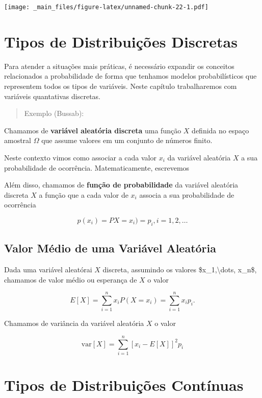 \documentclass[
]{book}
\begin{document}
\texttt{[image: \_main\_files/figure-latex/unnamed-chunk-22-1.pdf]}

\hypertarget{tipos-de-distribuiuxe7uxf5es-discretas}{%
\chapter{Tipos de Distribuições Discretas}\label{tipos-de-distribuiuxe7uxf5es-discretas}}

Para atender a situações mais práticas, é necessário expandir os conceitos relacionados a probabilidade de forma que tenhamos modelos probabilísticos que representem todos os tipos de variáveis. Neste capítulo trabalharemos com variáveis quantativas discretas.

\begin{quote}
Exemplo (Bussab):
\end{quote}

Chamamos de \textbf{variável aleatória discreta} uma função \(X\) definida no espaço amostral \(\Omega\) que assume valores em um conjunto de números finito.

Neste contexto vimos como associar a cada valor \(x_i\) da variável aleatória \(X\) a sua probabilidade de ocorrência. Matematicamente, escrevemos

Além disso, chamamos de \textbf{função de probabilidade} da variável aleatória discreta \(X\) a função que a cada valor de \(x_i\) associa a sua probabilidade de ocorrência

\[
p(x_i) = PX=x_i) = p_i, i =1, 2, \dots
\]

\hypertarget{valor-muxe9dio-de-uma-variuxe1vel-aleatuxf3ria}{%
\section{Valor Médio de uma Variável Aleatória}\label{valor-muxe9dio-de-uma-variuxe1vel-aleatuxf3ria}}

Dada uma variável aleatórai \(X\) discreta, assumindo os valores \$x\_1,\textbackslash dots, x\_n\$, chamamos de valor médio ou esperança de \(X\) o valor

\[
E[X] = \sum_{i=1}^n x_i P(X=x_i) = \sum_{i=1}^n x_i p_i.
\]

Chamamos de variância da variável aleatória \(X\) o valor

\[
\text{var}[X] = \sum_{i=1}^n [x_i - E[X]]^2 p_i
\]

\hypertarget{tipos-de-distribuiuxe7uxf5es-contuxednuas}{%
\chapter{Tipos de Distribuições Contínuas}\label{tipos-de-distribuiuxe7uxf5es-contuxednuas}}
\end{document}
